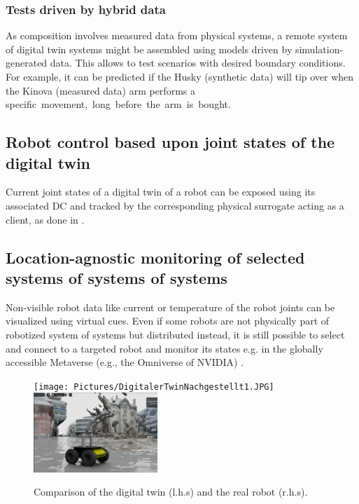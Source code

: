 \documentclass[conference]{IEEEtran}
\begin{document}
\subsubsection{Tests driven by hybrid data}
As composition involves measured data from physical systems, a remote system of digital twin systems might be assembled using models driven by simulation-generated data. This allows to test scenarios with desired boundary conditions. 
For example, it can be predicted if the Husky (synthetic data) will tip over when the Kinova (measured data) arm performs a \mbox{specific movement, long before the arm is bought.}
\subsection{Robot control based upon joint states of the digital twin}
Current joint states of a digital twin of a robot can be exposed using its associated DC and tracked by the corresponding physical surrogate acting as a client, as done in \cite{kaigom2020value}.
\subsection{Location-agnostic monitoring of selected systems of systems of systems}
Non-visible robot data like  current or temperature of the robot joints can be visualized using virtual cues.
Even if some  robots are not physically part of robotized system of systems but distributed instead, it is still possible to select and connect to a targeted robot and monitor its states  e.g. in the globally accessible Metaverse (e.g., the Omniverse of NVIDIA) \cite{kaigom2023metarobotics}.
\begin{figure}[t]
    \centerline{\texttt{[image: Pictures/DigitalerTwinNachgestellt1.JPG]}\hspace{0.1cm}\includegraphics[height=3cm]{Pictures/DigitalerTwinNachgestellt2.png}}
    \caption{Comparison of the digital twin (l.h.s) and the real robot (r.h.s).}
    \label{fig:CompareDigitalReal}
\end{figure}
\end{document}
